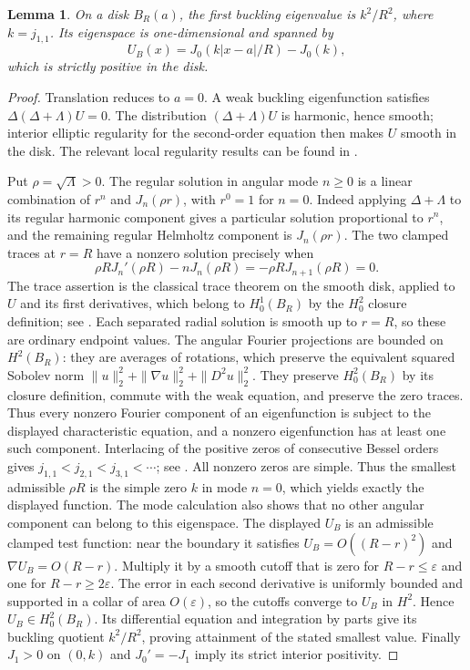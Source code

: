 \documentclass[11pt,letterpaper,reqno]{amsart}
\newtheorem{lemma}[theorem]{Lemma}
\theoremstyle{definition}
\begin{document}
\begin{lemma}\label{app:disk}
On a disk $B_R(a)$, the first buckling eigenvalue is $k^2/R^2$,
where $k=j_{1,1}$. Its eigenspace is one-dimensional and spanned by
\[
 U_B(x)=J_0(k|x-a|/R)-J_0(k),
\]
which is strictly positive in the disk.
\end{lemma}
\begin{proof}
Translation reduces to $a=0$. A weak buckling eigenfunction satisfies
$\Delta(\Delta+\Lambda)U=0$. The distribution
$(\Delta+\Lambda)U$ is harmonic, hence smooth; interior elliptic
regularity for the second-order equation then makes $U$ smooth
in the disk. The relevant local regularity results can be found in
\cite[Sections~2.2 and~6.3]{EvansPDE}.

Put $\rho=\sqrt\Lambda>0$. The regular solution in angular mode
$n\ge0$ is a linear combination of $r^n$ and $J_n(\rho r)$,
with $r^0=1$ for $n=0$. Indeed applying $\Delta+\Lambda$ to its
regular harmonic component gives a particular solution proportional
to $r^n$, and the remaining regular Helmholtz component is
$J_n(\rho r)$. The two clamped traces at $r=R$ have a nonzero
solution precisely when
\[
 \rho R J_n'(\rho R)-nJ_n(\rho R)
             =-\rho R J_{n+1}(\rho R)=0.
\]
The trace assertion is the classical trace theorem on the smooth
disk, applied to $U$ and its first derivatives, which belong to
$H_0^1(B_R)$ by the $H_0^2$ closure definition; see
\cite[Section~4.3]{EG}. Each separated radial solution is
smooth up to $r=R$, so these are ordinary endpoint values.
The angular Fourier projections are bounded on $H^2(B_R)$: they
are averages of rotations, which preserve the equivalent squared
Sobolev norm $\|u\|_2^2+\|\nabla u\|_2^2+\|D^2u\|_2^2$.
They preserve $H_0^2(B_R)$ by its closure definition, commute with
the weak equation, and preserve the zero traces. Thus every
nonzero Fourier component of an eigenfunction is subject to the
displayed characteristic equation, and a nonzero eigenfunction
has at least one such component.
Interlacing of the positive zeros of consecutive Bessel orders gives
$j_{1,1}<j_{2,1}<j_{3,1}<\cdots$; see
\cite[Section~10.21(i)]{DLMF}. All nonzero zeros are simple.
Thus the smallest admissible $\rho R$ is the simple zero $k$ in
mode $n=0$, which yields exactly the displayed function.
The mode calculation also shows that no other angular component
can belong to this eigenspace. The displayed $U_B$ is an admissible
clamped test function: near the boundary it satisfies
$U_B=O((R-r)^2)$ and $\nabla U_B=O(R-r)$. Multiply it by a smooth
cutoff that is zero for $R-r\le\varepsilon$ and one for
$R-r\ge2\varepsilon$. The error in each second derivative is
uniformly bounded and supported in a collar of area $O(\varepsilon)$,
so the cutoffs converge to $U_B$ in $H^2$. Hence $U_B\in H_0^2(B_R)$.
Its differential equation and integration by parts give its
buckling quotient $k^2/R^2$, proving attainment of the stated
smallest value. Finally $J_1>0$ on $(0,k)$ and
$J_0'=-J_1$ imply its strict interior positivity.
\end{proof}
\end{document}
